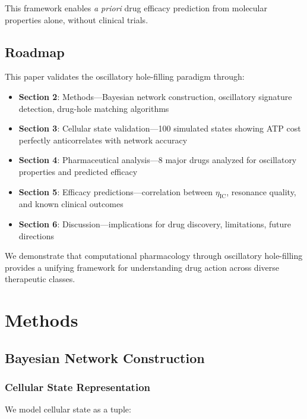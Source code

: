 \documentclass{article}
\begin{document}
This framework enables \textit{a priori} drug efficacy prediction from molecular properties alone, without clinical trials.

\subsection{Roadmap}

This paper validates the oscillatory hole-filling paradigm through:

\begin{itemize}
    \item \textbf{Section 2}: Methods—Bayesian network construction, oscillatory signature detection, drug-hole matching algorithms

    \item \textbf{Section 3}: Cellular state validation—100 simulated states showing ATP cost perfectly anticorrelates with network accuracy

    \item \textbf{Section 4}: Pharmaceutical analysis—8 major drugs analyzed for oscillatory properties and predicted efficacy

    \item \textbf{Section 5}: Efficacy predictions—correlation between $\eta_{\text{IC}}$, resonance quality, and known clinical outcomes

    \item \textbf{Section 6}: Discussion—implications for drug discovery, limitations, future directions
\end{itemize}

We demonstrate that computational pharmacology through oscillatory hole-filling provides a unifying framework for understanding drug action across diverse therapeutic classes.

\section{Methods}

\subsection{Bayesian Network Construction}

\subsubsection{Cellular State Representation}

We model cellular state as a tuple:
\end{document}
